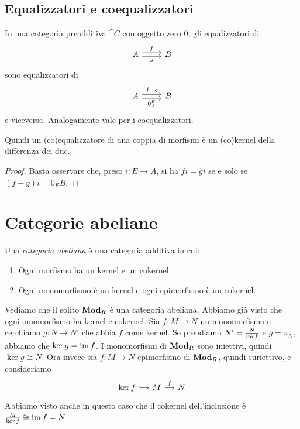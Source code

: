 \subsection{Equalizzatori e coequalizzatori}


\begin{proposition}\label{proposition:EqualizersAreKernels}
  In una categoria preadditiva \(\cat C\) con oggetto zero \(0\), gli
  equalizzatori di
  \[
    \begin{tikzcd}
      A \ar["f", r, shift left] \ar["g", r, shift right, swap] & B
    \end{tikzcd}
  \]
  sono equalizzatori di
  \[
    \begin{tikzcd}
      A \ar["{f-g}", r, shift left] \ar["{0_A^B}", r, shift right, swap]
      & B
    \end{tikzcd}
  \]
  e viceversa. Analogamente vale per i coequalizzatori.
\end{proposition}

Quindi un (co)equalizzatore di una coppia di morfismi è un (co)kernel
della differenza dei due.

\begin{proof}
  Basta osservare che, preso \(i : E \to A\), si ha \(fi = gi\) se e solo se \((f-g)i = 0_EB\).
\end{proof}



\section{Categorie abeliane}

\begin{definition}\label{definition:AbelianCategories}
  Una {\em categoria abeliana} è una categoria additiva in cui:
  \begin{enumerate}[leftmargin=*]
  \item Ogni morfismo ha un kernel e un cokernel.
  \item Ogni monomorfismo è un kernel e ogni epimorfismo è un cokernel.
  \end{enumerate}
\end{definition}

\begin{example}
  Vediamo che il solito \(\mathbf{Mod}_R\) è una categoria abeliana. Abbiamo
  già visto che ogni omomorfismo ha kernel e cokernel. Sia
  \(f : M \to N\) un monomorfismo e cerchiamo \(g : N \to N'\) che abbia
  \(f\) come kernel. Se prendiamo \(N' = \frac{N}{\operatorname{im} f}\) e
  \(g = \pi_N\), abbiamo che \(\ker g = \operatorname{im} f\). I monomorfismi di
  \(\mathbf{Mod}_R\) sono iniettivi, quindi \(\ker g \cong N\). Ora invece sia
  \(f : M \to N\) epimorfismo di \(\mathbf{Mod}_R\), quindi suriettivo, e
  consideriamo
  \[
    \begin{tikzcd}[column sep=small]
      \ker f \ar["{}", r, hookrightarrow] & M \ar["{f}", r] & N
    \end{tikzcd}
  \]
  Abbiamo visto anche in questo caso che il cokernel dell'inclusione è
  \(\frac{M}{\ker f} \cong \operatorname{im} f = N\).
\end{example}

